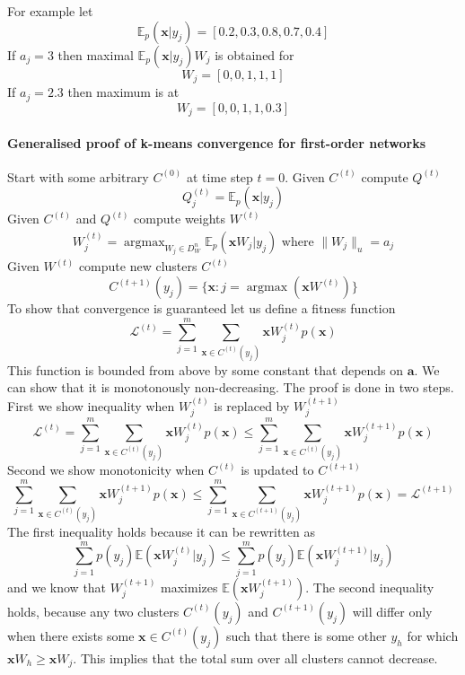 \documentclass[12pt]{article}
\DeclareMathOperator*{\argmax}{argmax}
\begin{document}
For example let 
\[
\mathbb{E}_{p}(\boldsymbol{x}|y_j) = [0.2,0.3,0.8,0.7,0.4]
\]
If $a_j=3$ then maximal $\mathbb{E}_{p}(\boldsymbol{x}|y_j)W_j$ is obtained for 
\[
W_j=[0,0,1,1,1]
\]
If $a_j=2.3$ then maximum is at
\[
W_j=[0,0,1,1,0.3]
\]

\paragraph{Generalised proof of k-means convergence for first-order networks}
Start with some arbitrary $C^{(0)}$ at time step $t=0$. Given $C^{(t)}$ compute $Q^{(t)}$
\[
Q^{(t)}_j = \mathbb{E}_p(\boldsymbol{x}|y_j)
\]
Given $C^{(t)}$ and $Q^{(t)}$ compute weights $W^{(t)}$
\begin{gather*}
	W_j^{(t)} = \argmax_{W_j\in D_W^{n}} \mathbb{E}_p(\boldsymbol{x}W_j|y_j)\text{ where } \lVert W_j \rVert_u=a_j
\end{gather*}
Given $W^{(t)}$ compute new clusters $C^{(t)}$
\[
C^{(t+1)}(y_j) = \{\boldsymbol{x} : j=\argmax(\boldsymbol{x}W^{(t)})\}
\]
To show that convergence is guaranteed let us define a fitness function
\[
\mathcal{L}^{(t)} = \sum_{j=1}^m \sum_{\boldsymbol{x}\in C^{(t)}(y_j)} \boldsymbol{x} W_j^{(t)} p(\boldsymbol{x})
\] 
This function is bounded from above by some constant that depends on $\boldsymbol{a}$. We can show that it is monotonously non-decreasing. The proof is done in two steps. First we show inequality when $W_j^{(t)}$  is replaced by $W_j^{(t+1)}$
\[\mathcal{L}^{(t)}= \sum_{j=1}^m \sum_{\boldsymbol{x}\in C^{(t)}(y_j)} \boldsymbol{x} W_j^{(t)} p(\boldsymbol{x}) \le \sum_{j=1}^m \sum_{\boldsymbol{x}\in C^{(t)}(y_j)} \boldsymbol{x}W_j^{(t+1)} p(\boldsymbol{x})\] 
Second we show monotonicity when $C^{(t)}$ is updated to $C^{(t+1)}$
\[\sum_{j=1}^m \sum_{\boldsymbol{x}\in C^{(t)}(y_j)} \boldsymbol{x} W_j^{(t+1)} p(\boldsymbol{x}) \le \sum_{j=1}^m \sum_{\boldsymbol{x}\in C^{(t+1)}(y_j)} \boldsymbol{x} W_j^{(t+1)} p(\boldsymbol{x})=\mathcal{L}^{(t+1)}\] 
The first inequality holds because it can be rewritten as
\[\sum_{j=1}^m p(y_j) \mathbb{E}(\boldsymbol{x} W_j^{(t)}|y_j)  \le \sum_{j=1}^m  p(y_j)  \mathbb{E}(\boldsymbol{x}W_j^{(t+1)}|y_j)\] 
and we know that $W_j^{(t+1)}$ maximizes $\mathbb{E}(\boldsymbol{x}W_j^{(t+1)})$.
The second inequality holds, because any two clusters $C^{(t)}(y_j)$ and  $C^{(t+1)}(y_j)$ will differ only when there exists some $\boldsymbol{x}\in C^{(t)}(y_j)$ such that there is some other $y_h$ for which $\boldsymbol{x}W_h \ge \boldsymbol{x} W_j$. This implies that the total sum over all clusters cannot decrease.
\end{document}
